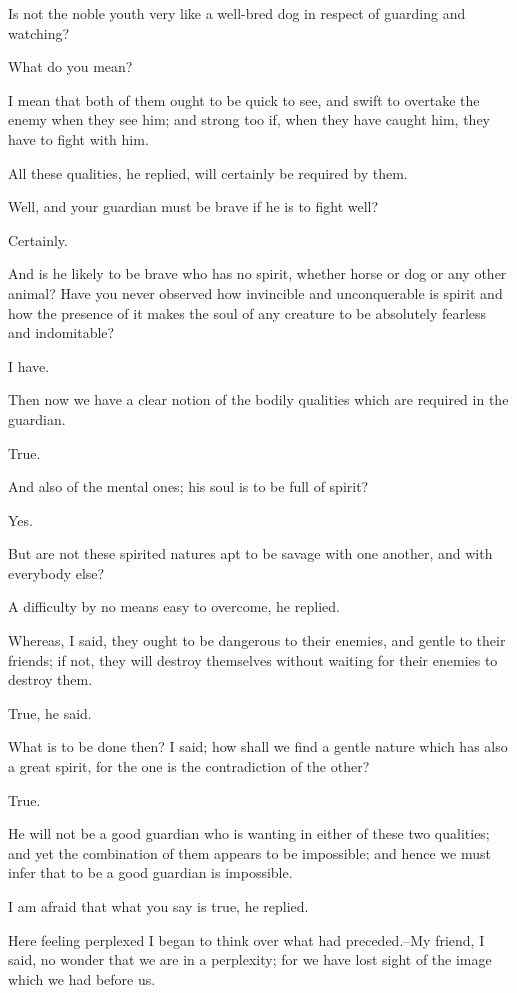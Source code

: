 Is not the noble youth very like a well-bred dog in respect of guarding
and watching?

What do you mean?

I mean that both of them ought to be quick to see, and swift to overtake
the enemy when they see him; and strong too if, when they have caught
him, they have to fight with him.

All these qualities, he replied, will certainly be required by them.

Well, and your guardian must be brave if he is to fight well?

Certainly.

And is he likely to be brave who has no spirit, whether horse or dog
or any other animal? Have you never observed how invincible and
unconquerable is spirit and how the presence of it makes the soul of any
creature to be absolutely fearless and indomitable?

I have.

Then now we have a clear notion of the bodily qualities which are
required in the guardian.

True.

And also of the mental ones; his soul is to be full of spirit?

Yes.

But are not these spirited natures apt to be savage with one another,
and with everybody else?

A difficulty by no means easy to overcome, he replied.

Whereas, I said, they ought to be dangerous to their enemies, and gentle
to their friends; if not, they will destroy themselves without waiting
for their enemies to destroy them.

True, he said.

What is to be done then? I said; how shall we find a gentle nature which
has also a great spirit, for the one is the contradiction of the other?

True.

He will not be a good guardian who is wanting in either of these two
qualities; and yet the combination of them appears to be impossible; and
hence we must infer that to be a good guardian is impossible.

I am afraid that what you say is true, he replied.

Here feeling perplexed I began to think over what had preceded.--My
friend, I said, no wonder that we are in a perplexity; for we have lost
sight of the image which we had before us.

